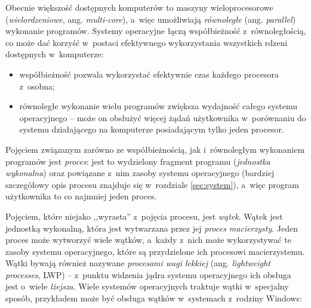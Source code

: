 \documentclass[12pt]{mwart}
\begin{document}
\indent
  Obecnie większość dostępnych komputerów to maszyny wieloprocesorowe (\emph{wielordzeniowe}, ang. \emph{multi-core}), a~więc umożliwiają
  \emph{równoległe} (ang. \emph{parallel}) wykonanie programów. Systemy operacyjne łączą współbieżność z~równoległością, co może dać korzyść w~postaci
  efektywnego wykorzystania wszystkich rdzeni dostępnych w~komputerze:
  \begin{itemize}
    \item współbieżność pozwala wykorzystać efektywnie czas każdego procesora z~osobna;
    \item równoległe wykonanie wielu programów zwiększa wydajność całego systemu operacyjnego -- może on obsłużyć więcej żądań użytkownika w~porównaniu do
      systemu działającego na komputerze posiadającym tylko jeden procesor.
  \end{itemize}
\par
\indent
  Pojęciem związanym zarówno ze współbieżnością, jak i~równoległym wykonaniem programów jest \emph{proces}: jest to wydzielony fragment programu (\emph{jednostka wykonalna})
  oraz powiązane z~nim zasoby systemu operacyjnego (bardziej szczegółowy opis procesu znajduje się w~rozdziale \ref{sec:system}),
  a~więc program użytkownika to co najmniej jeden proces.
\par
\indent
  Pojęciem, które niejako ,,wyrasta'' z~pojęcia procesu, jest \emph{wątek}. Wątek jest jednostką wykonalną, która jest wytwarzana przez jej \emph{proces macierzysty}.
  Jeden proces może wytworzyć wiele wątków, a~każdy z~nich może wykorzystywać te zasoby systemu operacyjnego, które są przydzielone ich procesowi macierzystemu.
\indent
  Wątki bywają również nazywane \emph{procesami wagi lekkiej} (ang. \emph{lightweight processes}, LWP) -- z~punktu widzenia jądra systemu operacyjnego
  ich obsługa jest o~wiele \emph{lżejsza}.
%
  Wiele systemów operacyjnych traktuje wątki w~specjalny sposób, przykładem może być obsługa wątków w~systemach z~rodziny Windows:
\end{document}
